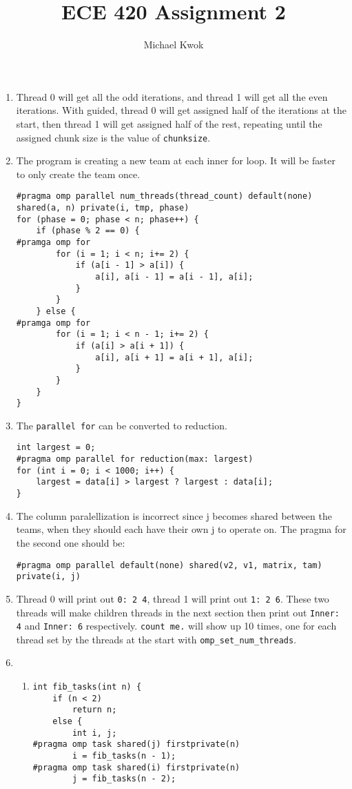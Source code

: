 \documentclass{article}
\title{ECE 420 Assignment 2}
\author{Michael Kwok}
\begin{document}
\maketitle
\begin{enumerate}
    \item Thread 0 will get all the odd iterations, and thread 1 will get all the even iterations. With guided, thread 0 will get assigned half of the iterations at the start, then thread 1 will get assigned half of the rest, repeating until the assigned chunk size is the value of \verb|chunksize|.
    \item The program is creating a new team at each inner for loop. It will be faster to only create the team once.
          \begin{verbatim}
#pragma omp parallel num_threads(thread_count) default(none) shared(a, n) private(i, tmp, phase)
for (phase = 0; phase < n; phase++) {
    if (phase % 2 == 0) {
#pramga omp for
        for (i = 1; i < n; i+= 2) {
            if (a[i - 1] > a[i]) {
                a[i], a[i - 1] = a[i - 1], a[i];
            }
        }
    } else {
#pramga omp for
        for (i = 1; i < n - 1; i+= 2) {
            if (a[i] > a[i + 1]) {
                a[i], a[i + 1] = a[i + 1], a[i];
            }
        }
    }
}\end{verbatim}

    \item The \verb|parallel for| can be converted to reduction.
          \begin{verbatim}
int largest = 0;
#pragma omp parallel for reduction(max: largest)
for (int i = 0; i < 1000; i++) {
    largest = data[i] > largest ? largest : data[i];
}
\end{verbatim}
    \item The column paralellization is incorrect since j becomes shared between the teams, when they should each have their own j to operate on. The pragma for the second one should be:
          \begin{verbatim}
#pragma omp parallel default(none) shared(v2, v1, matrix, tam) private(i, j)
\end{verbatim}
    \item Thread 0 will print out \verb|0: 2 4|, thread 1 will print out \verb|1: 2 6|. These two threads will make children threads in the next section then print out \verb|Inner: 4| and \verb|Inner: 6| respectively. \verb|count me.| will show up 10 times, one for each thread set by the threads at the start with \verb|omp_set_num_threads|.
    \item \begin{enumerate}
              \item \begin{verbatim}
int fib_tasks(int n) {
    if (n < 2)
        return n;
    else {
        int i, j;
#pragma omp task shared(j) firstprivate(n)
        i = fib_tasks(n - 1);
#pragma omp task shared(i) firstprivate(n)
        j = fib_tasks(n - 2);


\end{verbatim}
\end{enumerate}
\end{enumerate}
\end{document}
